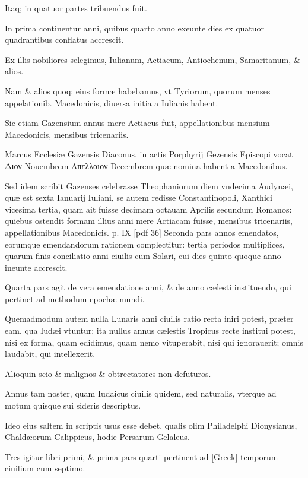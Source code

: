 \begin{parnumbers}
Itaq; in quatuor partes tribuendus fuit.

In prima continentur anni, quibus quarto anno exeunte dies ex quatuor quadrantibus conflatus accrescit.

Ex illis nobiliores selegimus, Iulianum, Actiacum, Antiochenum, Samaritanum, \& alios. 

Nam \& alios quoq; eius formæ habebamus, vt Tyriorum, quorum menses appelationib. Macedonicis, diuersa initia a Iulianis habent.

Sic etiam Gazensium annus mere Actiacus fuit, appellationibus mensium Macedonicis, mensibus tricenariis. 

Marcus Ecclesiæ Gazensis Diaconus, in actis Porphyrij Gezensis Episcopi vocat \textgreek{Διον} Nouembrem \textgreek{Απελλαιον} Decembrem quæ nomina habent a Macedonibus. 

Sed idem scribit Gazenses celebrasse Theophaniorum diem vndecima Audynæi, quæ est sexta Ianuarij Iuliani, se autem redisse Constantinopoli, Xanthici vicesima tertia, quam ait fuisse decimam octauam Aprilis secundum Romanos: quiebus ostendit formam illius anni mere Actiacam fuisse, mensibus tricenariis, appellationibus Macedonicis. 
\clearpage
p. IX [pdf 36]
Seconda pars annos emendatos, eorumque emendandorum
rationem complectitur: tertia periodos multiplices, quarum finis conciliatio anni ciuilis cum Solari, cui dies quinto quoque anno ineunte accrescit.

Quarta pars agit de vera emendatione anni, \& de anno cælesti instituendo, qui pertinet ad methodum epochæ mundi.

Quemadmodum autem nulla Lunaris anni ciuilis ratio recta iniri potest, præter eam, qua Iudæi vtuntur: ita nullus annus cælestis Tropicus recte institui potest, nisi ex forma, quam edidimus, quam nemo vituperabit, nisi qui ignorauerit; omnis laudabit, qui intellexerit.

Alioquin scio \& malignos \& obtrectatores non defuturos. 

Annus tam noster, quam Iudaicus ciuilis quidem, sed naturalis, vterque ad motum quisque sui sideris descriptus. 

Ideo eius saltem in scriptis usus esse debet, qualis olim Philadelphi Dionysianus, Chaldæorum Calippicus, hodie Persarum Gelaleus. 

Tres igitur libri primi, \& prima pars quarti pertinent ad \textgreek{[Greek]} temporum ciuilium cum septimo.


\end{parnumbers}
